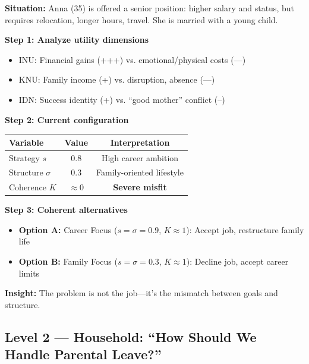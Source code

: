 \begin{tcolorbox}[colback=orange!5!white, colframe=orange!75!black,
    title=\textbf{Worked Example L=1: Career Decision}]

\textbf{Situation:} Anna (35) is offered a senior position: higher salary and status,
but requires relocation, longer hours, travel. She is married with a young child.

\textbf{Step 1: Analyze utility dimensions}
\begin{itemize}[nosep]
  \item INU: Financial gains (+++) vs. emotional/physical costs (---)
  \item KNU: Family income (+) vs. disruption, absence (---)
  \item IDN: Success identity (+) vs. ``good mother'' conflict (--)
\end{itemize}

\textbf{Step 2: Current configuration}
\begin{center}
\begin{tabular}{@{}lcc@{}}
Variable & Value & Interpretation \\
\hline
Strategy $s$ & 0.8 & High career ambition \\
Structure $\sigma$ & 0.3 & Family-oriented lifestyle \\
Coherence $K$ & $\approx 0$ & \textbf{Severe misfit} \\
\end{tabular}
\end{center}

\textbf{Step 3: Coherent alternatives}
\begin{itemize}[nosep]
  \item \textbf{Option A:} Career Focus ($s=\sigma=0.9$, $K \approx 1$): Accept job, restructure family life
  \item \textbf{Option B:} Family Focus ($s=\sigma=0.3$, $K \approx 1$): Decline job, accept career limits
\end{itemize}

\textbf{Insight:} The problem is not the job—it's the mismatch between goals and structure.

\end{tcolorbox}

\subsection{Level 2 — Household: ``How Should We Handle Parental Leave?''}

